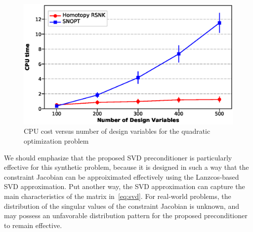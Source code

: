 \begin{figure}[tbp]
  \centering
  \includegraphics[clip,width=1.0\textwidth]{./figs/chap4_test/random_100_color.eps}%
  \caption{CPU cost versus number of design variables for the quadratic
    optimization problem \label{fig:quad_scale}}
\end{figure}

We should emphasize that the proposed SVD preconditioner is particularly effective for this synthetic problem, because it is designed in such a way that the constraint Jacobian can be approiximated effectively using the Lanzcos-based SVD approximation.
Put another way, the SVD approximation can capture the main characteristics of the matrix in~\eqref{eq:svd}. For real-world problems, the distribution of the singular values of the constraint Jacobian is unknown, and may possess an unfavorable distribution pattern for the proposed preconditioner to remain effective.



